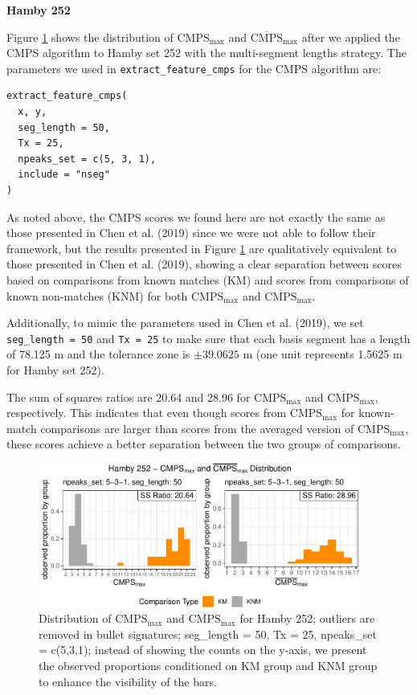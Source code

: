 \textbf{Hamby 252}

Figure \ref{fig:result1-252} shows the distribution of \(\mathrm{CMPS_{max}}\) and \(\mathrm{\overline{CMPS}_{max}}\) after we applied the CMPS algorithm to Hamby set 252 with the multi-segment lengths strategy.
The parameters we used in \texttt{extract\_feature\_cmps} for the CMPS algorithm are:

\begin{verbatim}
extract_feature_cmps(
  x, y,
  seg_length = 50,
  Tx = 25,
  npeaks_set = c(5, 3, 1),
  include = "nseg"
)
\end{verbatim}

As noted above, the CMPS scores we found here are not exactly the same as those presented in Chen et al. (2019) since we were not able to follow their framework, but the results presented in Figure \ref{fig:result1-252} are qualitatively equivalent to those presented in Chen et al. (2019), showing a clear separation between scores based on comparisons from known matches (KM) and scores from comparisons of known non-matches (KNM) for both \(\mathrm{CMPS_{max}}\) and \(\mathrm{\overline{CMPS}_{max}}\).

Additionally, to mimic the parameters used in Chen et al. (2019), we set \texttt{seg\_length\ =\ 50} and \texttt{Tx\ =\ 25} to make sure that each basis segment has a length of 78.125 \textmu m and the tolerance zone is \(\pm 39.0625\) \textmu m (one unit represents 1.5625 \textmu m for Hamby set 252).

The sum of squares ratios are 20.64 and 28.96 for \(\mathrm{CMPS_{max}}\) and \(\mathrm{\overline{CMPS}_{max}}\), respectively.
This indicates that even though scores from \(\mathrm{CMPS_{max}}\) for known-match comparisons are larger than scores from the averaged version of \(\mathrm{\overline{CMPS}_{max}}\), these scores achieve a better separation between the two groups of comparisons.

\begin{figure}

{\centering \includegraphics[width=400px]{ju-hofmann_files/figure-latex/result1-252-1} 

}

\caption{Distribution of $\mathrm{CMPS_{max}}$ and $\mathrm{\overline{CMPS}_{max}}$ for Hamby 252; outliers are removed in bullet signatures; seg\_length = 50, Tx = 25, npeaks\_set = c(5,3,1); instead of showing the counts on the y-axis, we present the observed proportions conditioned on KM group and KNM group to enhance the visibility of the bars. }\label{fig:result1-252}
\end{figure}

